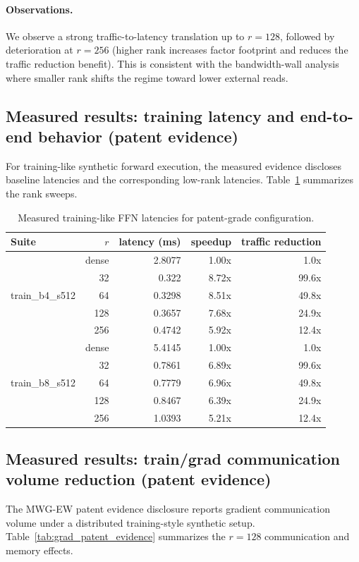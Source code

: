 \documentclass[11pt]{article}
\begin{document}
\paragraph{Observations.}
We observe a strong traffic-to-latency translation up to $r=128$, followed by deterioration at $r=256$ (higher rank increases factor footprint and reduces the traffic reduction benefit). This is consistent with the bandwidth-wall analysis where smaller rank shifts the regime toward lower external reads.

\subsection{Measured results: training latency and end-to-end behavior (patent evidence)}
For training-like synthetic forward execution, the measured evidence discloses baseline latencies and the corresponding low-rank latencies. Table~\ref{tab:train_patent_evidence} summarizes the rank sweeps.

\begin{table}[t]
\centering
\caption{Measured training-like FFN latencies for patent-grade configuration.}
\label{tab:train_patent_evidence}
\begin{tabular}{@{}lrrrr@{}}
\toprule
\textbf{Suite} & $r$ & latency (ms) & speedup & traffic reduction \\
\midrule
\multirow{5}{*}{train\_b4\_s512} & dense & 2.8077 & 1.00x & 1.0x \\
& 32 & 0.322 & 8.72x & 99.6x \\
& 64 & 0.3298 & 8.51x & 49.8x \\
& 128 & 0.3657 & 7.68x & 24.9x \\
& 256 & 0.4742 & 5.92x & 12.4x \\
\midrule
\multirow{5}{*}{train\_b8\_s512} & dense & 5.4145 & 1.00x & 1.0x \\
& 32 & 0.7861 & 6.89x & 99.6x \\
& 64 & 0.7779 & 6.96x & 49.8x \\
& 128 & 0.8467 & 6.39x & 24.9x \\
& 256 & 1.0393 & 5.21x & 12.4x \\
\bottomrule
\end{tabular}
\end{table}

\subsection{Measured results: train/grad communication volume reduction (patent evidence)}
The MWG-EW patent evidence disclosure reports gradient communication volume under a distributed training-style synthetic setup. Table~\ref{tab:grad_patent_evidence} summarizes the $r=128$ communication and memory effects.
\end{document}
